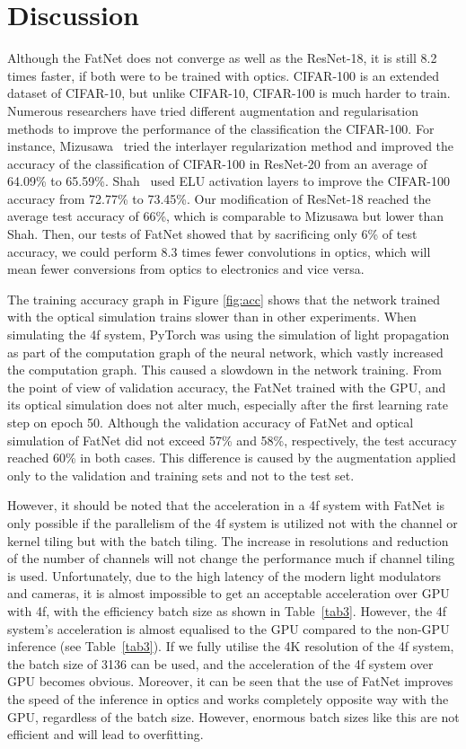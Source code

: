 \documentclass{article}
\begin{document}
\section{Discussion}

Although the FatNet does not converge as well as the ResNet-18, it is still 8.2 times faster, if both were to be trained with optics. CIFAR-100 is an extended dataset of CIFAR-10, but unlike CIFAR-10, CIFAR-100 is much harder to train. Numerous researchers have tried different augmentation and regularisation methods to improve the performance of the classification the CIFAR-100. For instance, Mizusawa~\cite{mizusawa_interlayer_2021} tried the interlayer regularization method and improved the accuracy of the classification of CIFAR-100 in ResNet-20 from an average of 64.09\% to 65.59\%. Shah~\cite{shah_deep_2016} used ELU activation layers to improve the CIFAR-100 accuracy from 72.77\% to 73.45\%. Our modification of ResNet-18 reached the average test accuracy of 66\%, which is comparable to Mizusawa but lower than Shah. Then, our tests of FatNet showed that by sacrificing only 6\% of test accuracy, we could perform 8.3 times fewer convolutions in optics, which will mean fewer conversions from optics to electronics and vice versa. 

The training accuracy graph in Figure \ref{fig:acc} shows that the network trained with the optical simulation trains slower than in other experiments. When simulating the 4f system, PyTorch was using the simulation of light propagation as part of the computation graph of the neural network, which vastly increased the computation graph. This caused a slowdown in the network training. From the point of view of validation accuracy, the FatNet trained with the GPU, and its optical simulation does not alter much, especially after the first learning rate step on epoch 50. Although the validation accuracy of FatNet and optical simulation of FatNet did not exceed 57\% and 58\%, respectively, the test accuracy reached 60\% in both cases. This difference is caused by the augmentation applied only to the validation and training sets and not to the test set.

However, it should be noted that the acceleration in a 4f system with FatNet is only possible if the parallelism of the 4f system is utilized not with the channel or kernel tiling but with the batch tiling. The increase in resolutions and reduction of the number of channels will not change the performance much if channel tiling is used. Unfortunately, due to the high latency of the modern light modulators and cameras, it is almost impossible to get an acceptable acceleration over GPU with 4f, with the efficiency batch size as shown in Table~\ref{tab3}. However, the 4f system's acceleration is almost equalised to the GPU compared to the non-GPU inference (see Table~\ref{tab3}). If we fully utilise the 4K resolution of the 4f system, the batch size of 3136 can be used, and the acceleration of the 4f system over GPU becomes obvious. Moreover, it can be seen that the use of FatNet improves the speed of the inference in optics and works completely opposite way with the GPU, regardless of the batch size. However, enormous batch sizes like this are not efficient and will lead to overfitting.
\end{document}

